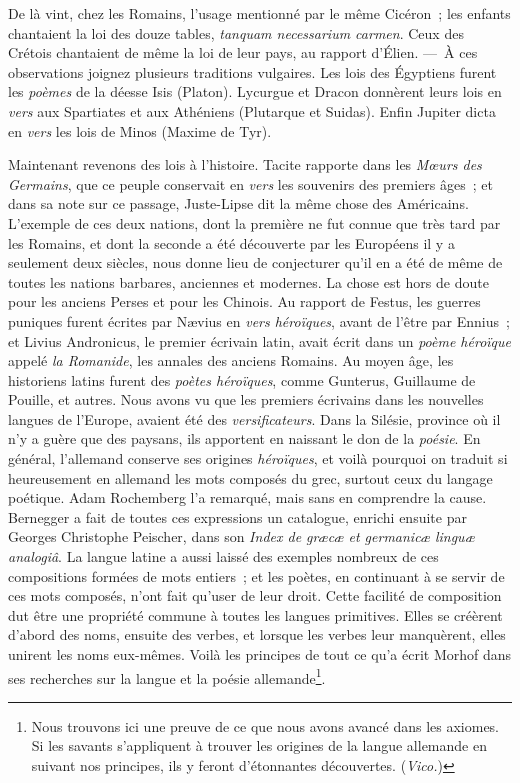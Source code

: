 \documentclass[french,twoside]{book} %
\begin{document}
\noindent De là vint, chez les Romains, l’usage mentionné par le même Cicéron ; les enfants chantaient la loi des douze tables, \emph{{\itshape tanquam necessarium carmen}}. Ceux des Crétois chantaient de même la loi de leur pays, au rapport d’Élien. — À ces observations joignez plusieurs traditions vulgaires. Les lois des Égyptiens furent les {\itshape poèmes} de la déesse Isis (Platon). Lycurgue et Dracon donnèrent leurs lois en {\itshape vers} aux Spartiates et aux Athéniens (Plutarque et Suidas). Enfin Jupiter dicta en {\itshape vers} les lois de Minos (Maxime de Tyr).\par
Maintenant revenons des lois à l’histoire. Tacite rapporte dans les {\itshape Mœurs des Germains}, que ce peuple conservait en {\itshape vers} les souvenirs des premiers âges ; et dans sa note sur ce passage, Juste-Lipse dit la même chose des Américains. L’exemple de ces deux nations, dont la première ne fut connue que très tard par les Romains, et dont la seconde a été découverte par les Européens il y a seulement deux siècles, nous donne lieu de conjecturer qu’il en a été de même de toutes les nations barbares, anciennes et modernes. La chose est hors de doute pour les anciens Perses et pour les Chinois. Au rapport de Festus, les guerres puniques furent écrites  par Nævius en {\itshape vers héroïques}, avant de l’être par Ennius ; et Livius Andronicus, le premier écrivain latin, avait écrit dans un {\itshape poème héroïque} appelé {\itshape la Romanide}, les annales des anciens Romains. Au moyen âge, les historiens latins furent des {\itshape poètes héroïques}, comme Gunterus, Guillaume de Pouille, et autres. Nous avons vu que les premiers écrivains dans les nouvelles langues de l’Europe, avaient été des {\itshape versificateurs}. Dans la Silésie, province où il n’y a guère que des paysans, ils apportent en naissant le don de la {\itshape poésie}. En général, l’allemand conserve ses origines {\itshape héroïques}, et voilà pourquoi on traduit si heureusement en allemand les mots composés du grec, surtout ceux du langage poétique. Adam Rochemberg l’a remarqué, mais sans en comprendre la cause. Bernegger a fait de toutes ces expressions un catalogue, enrichi ensuite par Georges Christophe Peischer, dans son {\itshape Index de græcæ et germanicæ linguæ analogiâ}. La langue latine a aussi laissé des exemples nombreux de ces compositions formées de mots entiers ; et les poètes, en continuant à se servir de ces mots composés, n’ont fait qu’user de leur droit. Cette facilité de composition dut être une propriété commune à toutes les langues primitives. Elles se créèrent d’abord des noms, ensuite des verbes, et lorsque les verbes leur manquèrent, elles unirent les noms eux-mêmes. Voilà les principes de tout ce qu’a écrit Morhof dans ses recherches sur la langue et la poésie allemande\footnote{Nous trouvons ici une preuve de ce que nous avons avancé dans les axiomes. Si les savants s’appliquent à trouver les origines de la langue allemande en suivant nos principes, ils y feront d’étonnantes découvertes. ({\itshape Vico.})}.\par
\end{document}

